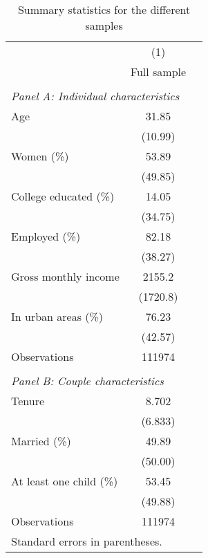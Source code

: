 \begin{singlespace}
\begin{table}[h!]\centering\footnotesize
 \def\sym#1{\ifmmode^{#1}\else\(^{#1}\)\fi} 
\caption{Summary statistics for the different samples} 
\label{tab:sumstat} 
\begin{tabular}{l*{2}{c}} 
\hline\hline
                    &\multicolumn{1}{c}{(1)}\\
                    &\multicolumn{1}{c}{Full sample}\\
\hline \\ \multicolumn{3}{l}{\textit{Panel A: Individual characteristics}} \\
Age                 &       31.85         \\
                    &     (10.99)         \\
[1em]
Women (\%)          &       53.89         \\
                    &     (49.85)         \\
[1em]
College educated (\%)&       14.05         \\
                    &     (34.75)         \\
[1em]
Employed (\%)       &       82.18         \\
                    &     (38.27)         \\
[1em]
Gross monthly income&      2155.2         \\
                    &    (1720.8)         \\
[1em]
In urban areas (\%) &       76.23         \\
                    &     (42.57)         \\
\hline
Observations        &      111974         \\
\hline \\ \multicolumn{3}{l}{\textit{Panel B: Couple characteristics}} \\ 
Tenure              &       8.702         \\
                    &     (6.833)         \\
[1em]
Married (\%)        &       49.89         \\
                    &     (50.00)         \\
[1em]
At least one child (\%)&       53.45         \\
                    &     (49.88)         \\
\hline
Observations        &      111974         \\
\hline\hline 
\multicolumn{3}{l}{\footnotesize Standard errors in parentheses.}
\end{tabular} 
\end{table} 
\end{singlespace}
